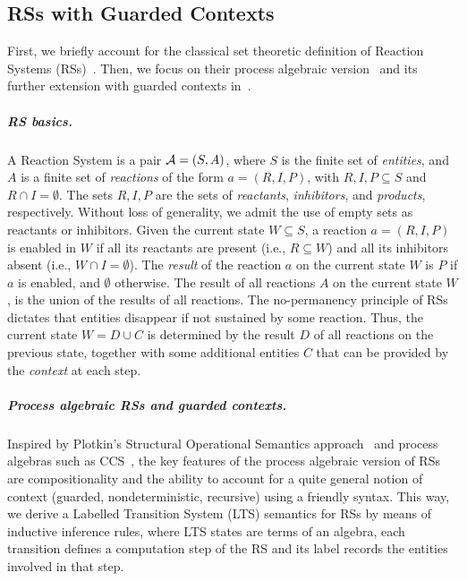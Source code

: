 
\subsection{RSs with Guarded Contexts}\label{sec:RS}

First, we briefly account for the classical set theoretic definition of Reaction Systems (RSs)~\cite{DBLP:journals/fuin/EhrenfeuchtR07}. Then, we focus on their process algebraic version~\cite{DBLP:journals/tcs/BrodoBF21} and its further extension with guarded contexts in~\cite{DBLP:conf/cmsb/BowlesBBFGM24}. 


\subparagraph*{RS basics.}
A Reaction System is a pair ${\cal A} = (S, A)$, where $S$ is the finite set of \emph{entities}, and $A$ is a finite set of \emph{reactions} of the form $a = (R,I,P)$, with $R, I, P\subseteq S$ and $R \cap I = \emptyset$. 
The sets $R, I, P$ are the sets of \emph{reactants}, \emph{inhibitors}, and  \emph{products}, respectively. 
Without loss of generality, we admit the use of empty sets as reactants or inhibitors.
%
Given the current state $W\subseteq S$, a reaction $a = (R,I,P)$ is enabled in $W$ if all its reactants are present (i.e., $R\subseteq W$) and all its inhibitors absent (i.e., $W \cap I = \emptyset$).
The \emph{result} of the reaction $a$ on the current state $W$ is $P$ if $a$ is enabled, and
$\emptyset$ otherwise.
The result of all reactions $A$ on the current state $W$, is the union of the results of all reactions.
%
The no-permanency principle of RSs dictates that entities disappear if not sustained by some reaction.
Thus, the current state $W=D\cup C$ is determined by the result $D$ of all reactions on the previous state, together with some additional entities $C$ that can be provided by the \emph{context} at each step. 

\subparagraph*{Process algebraic RSs and guarded contexts.}
Inspired by Plotkin's Structural Operational Semantics approach~\cite{DBLP:journals/jlp/Plotkin04a} and process algebras such as CCS~\cite{Milner80}, the key features of the process algebraic version of RSs are compositionality and the ability to account for a quite general notion of context (guarded, nondeterministic, recursive) using a friendly syntax. This way, we derive a Labelled Transition System (LTS) semantics for RSs by means of inductive inference rules, where LTS states are terms of an algebra, each transition defines a computation step of the RS and its label records the entities involved in that step.

